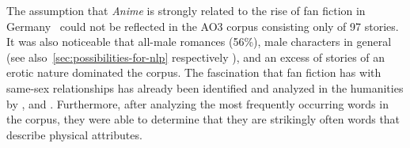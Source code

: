 The assumption that \emph{Anime} is strongly related to the rise of fan fiction in Germany~\citep{Cuntz-Leng2015AGermany} could not be reflected in the AO3 corpus consisting only of 97 stories.
It was also noticeable that all-male romances (56\%), male characters in general (see also~\ref{sec:possibilities-for-nlp} respectively \citet{Kleindienst2020InvestigatingSupernatural}), and an excess of stories of an erotic nature dominated the corpus.
The fascination that fan fiction has with same-sex relationships has already been identified and analyzed in the humanities by \citet{HelleksonBusse2006}, \citet{Tosenberger2008HomosexualityFanfiction} and \citet{Duggan2017RevisingFanfiction}.
Furthermore, after analyzing the most frequently occurring words in the corpus, they were able to determine that they are strikingly often words that describe physical attributes.


